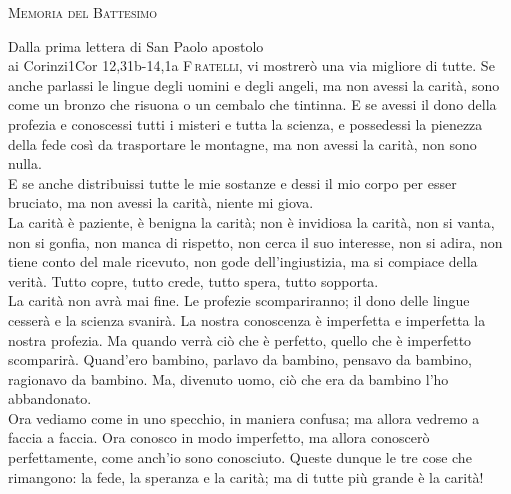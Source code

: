 \documentclass[11pt,a4paper]{book}
\renewcommand{\intestfont}[1]{{\Large\scshape\textcolor{SAGEcolor}{#1}}} %
\newcommand{\sottomomento}[1]{{\intestfont{#1}}\par\medskip}
\begin{document}
\begin{pages}
\begin{Leftside}
  \beginnumbering
  \pstart 
  \vspace{0.5in}
        \sottomomento{Memoria del Battesimo}
  \pend 
  \pstart 
  \vspace{0.2in}
        \introduzione
  \pend
  \pstart 
        \membatt
  \pend
  \pstart 
  \pend 
  \pstart 
  \vspace{0.5in}
        \begin{lettura}[]{Dalla prima lettera di San Paolo apostolo \\ai Corinzi}{1Cor 12,31b-14,1a} %
        \lettrine[nindent=0pt,slope=-0.4em,lines=3]{F}{\,ratelli}, vi mostrerò una via migliore di tutte.
        Se anche parlassi le lingue degli uomini e degli angeli, ma non avessi la carità, sono come un bronzo che risuona o un cembalo che tintinna.
        E se avessi il dono della profezia e conoscessi tutti i misteri e tutta la scienza, e possedessi la pienezza della fede così da trasportare le montagne, ma non avessi la carità, non sono nulla.\\
        E se anche distribuissi tutte le mie sostanze e dessi il mio corpo per esser bruciato, ma non avessi la carità, niente mi giova.\\
        La carità è paziente, è benigna la carità; non è invidiosa la carità, non si vanta, non si gonfia, non manca di rispetto, non cerca il suo interesse, non si adira, non tiene conto del male ricevuto, non gode dell'ingiustizia, ma si compiace della verità. Tutto copre, tutto crede, tutto spera, tutto sopporta.\\
        La carità non avrà mai fine. Le profezie scompariranno; il dono delle lingue cesserà e la scienza svanirà. La nostra conoscenza è imperfetta e imperfetta la nostra profezia. Ma quando verrà ciò che è perfetto, quello che è imperfetto scomparirà. Quand'ero bambino, parlavo da bambino, pensavo da bambino, ragionavo da bambino. Ma, divenuto uomo, ciò che era da bambino l’ho abbandonato.\\
        Ora vediamo come in uno specchio, in maniera confusa; ma allora vedremo a faccia a faccia. Ora conosco in modo imperfetto, ma allora conoscerò perfettamente, come anch'io sono conosciuto. Queste dunque le tre cose che rimangono: la fede, la speranza e la carità; ma di tutte più grande è la carità!\\

\end{lettura}
\end{Leftside}
\end{pages}
\end{document}
